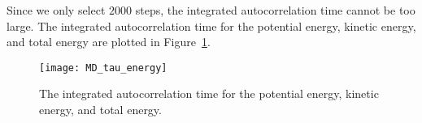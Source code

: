 Since we only select \(2000\) steps, the integrated autocorrelation time
cannot be too large.
The integrated autocorrelation time for the potential energy, kinetic energy,
and total energy are plotted in Figure~\ref{fig:MD_tau_energy}.

\begin{figure}
    \centering
    \texttt{[image: MD\_tau\_energy]}
    \caption{The integrated autocorrelation time for the potential energy, kinetic energy,
        and total energy.}
    \label{fig:MD_tau_energy}
\end{figure}

